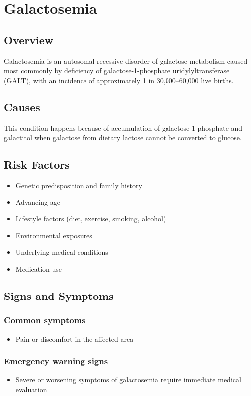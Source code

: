 \chapter{Galactosemia}
\label{sec:Galactosemia}

\section{Overview}
Galactosemia is an autosomal recessive disorder of galactose metabolism caused most commonly by deficiency of galactose-1-phosphate uridylyltransferase (GALT), with an incidence of approximately 1 in 30,000--60,000 live births.
\section{Causes}
This condition happens because of accumulation of galactose-1-phosphate and galactitol when galactose from dietary lactose cannot be converted to glucose.     
\section{Risk Factors}

\begin{itemize}[noitemsep]
  \item Genetic predisposition and family history
  \item Advancing age
  \item Lifestyle factors (diet, exercise, smoking, alcohol)
  \item Environmental exposures
  \item Underlying medical conditions
  \item Medication use
\end{itemize}
\section{Signs and Symptoms}

\subsection{Common symptoms}
\begin{itemize}[noitemsep]
  \item Pain or discomfort in the affected area
  \end{itemize}

\subsection{Emergency warning signs}
\begin{itemize}[noitemsep]
  \item Severe or worsening symptoms of galactosemia require immediate medical evaluation
\end{itemize}
